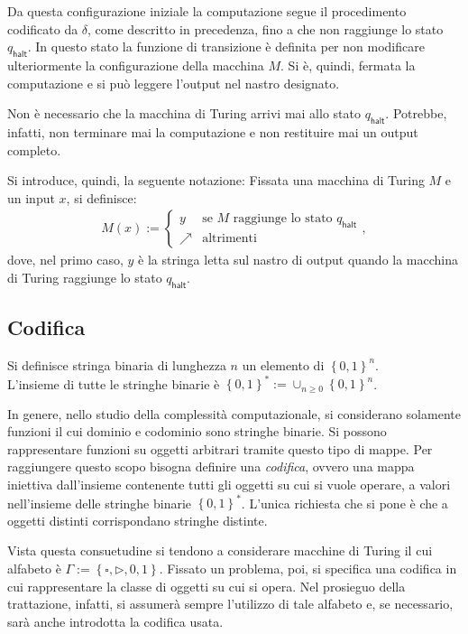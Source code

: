 Da questa configurazione iniziale la computazione segue il procedimento codificato da $\delta$, come descritto in precedenza, fino a che non raggiunge lo stato $q_{\mathsf{halt}}$.
In questo stato la funzione di transizione è definita per non modificare ulteriormente la configurazione della macchina $M$.
Si è, quindi, fermata la computazione e si può leggere l'output nel nastro designato.

Non è necessario che la macchina di Turing arrivi mai allo stato $q_{\mathsf{halt}}$. Potrebbe, infatti, non terminare mai la computazione e non restituire mai un output completo.

Si introduce, quindi, la seguente notazione: Fissata una macchina di Turing $M$ e un input $x$, si definisce:
\begin{align}
 M(x) := 
 \begin{cases}
  y & \text{se } M \text{ raggiunge lo stato } q_{\mathsf{halt}}\\
  \nearrow & \text{altrimenti}
 \end{cases},
\end{align}
dove, nel primo caso, $y$ è la stringa letta sul nastro di output quando la macchina di Turing raggiunge lo stato $q_{\mathsf{halt}}$.

\subsection{Codifica}
\begin{defn}
 Si definisce stringa binaria di lunghezza $n$ un elemento di $\left\{0,1\right\}^n$.\\
 L'insieme di tutte le stringhe binarie è $\left\{0,1\right\}^* := \cup_{n\geq0}\left\{0,1\right\}^n$.
\end{defn}
In genere, nello studio della complessità computazionale, si considerano solamente funzioni il cui dominio e codominio sono stringhe binarie.
Si possono rappresentare funzioni su oggetti arbitrari tramite questo tipo di mappe.
Per raggiungere questo scopo bisogna definire una \textit{codifica}, ovvero una mappa iniettiva dall'insieme contenente tutti gli oggetti su cui si vuole operare, a valori nell'insieme delle stringhe binarie $\left\{0,1\right\}^*$.
L'unica richiesta che si pone è che a oggetti distinti corrispondano stringhe distinte.

Vista questa consuetudine si tendono a considerare macchine di Turing il cui alfabeto è $\Gamma := \left\{\square, \rhd, 0, 1\right\}$.
Fissato un problema, poi, si specifica una codifica in cui rappresentare la classe di oggetti su cui si opera. Nel prosieguo della trattazione, infatti, si assumerà sempre l'utilizzo di tale alfabeto e, se necessario, sarà anche introdotta la codifica usata.

